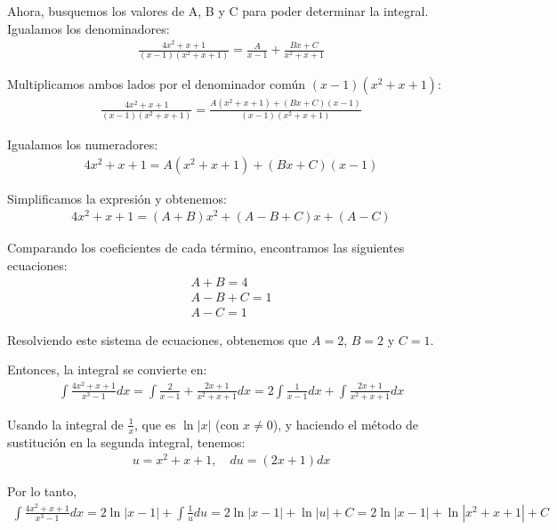 \documentclass{report}
\begin{document}
\begin{enumerate}
        Ahora, busquemos los valores de A, B y C para poder determinar la integral. Igualamos los denominadores:
        \begin{align*}
        \frac{4x^2+x+1}{(x-1)(x^2+x+1)}=\frac{A}{x-1}+\frac{Bx+C}{x^2+x+1}
        \end{align*}
        
        Multiplicamos ambos lados por el denominador común $(x-1)(x^2+x+1)$:
        \begin{align*}
        \frac{4x^2+x+1}{(x-1)(x^2+x+1)}=\frac{A(x^2+x+1)+(Bx+C)(x-1)}{(x-1)(x^2+x+1)}
        \end{align*}
        
        Igualamos los numeradores:
        \begin{align*}
        4x^2+x+1=A(x^2+x+1)+(Bx+C)(x-1)
        \end{align*}
        
        Simplificamos la expresión y obtenemos:
        \begin{align*}
        4x^2+x+1=(A+B)x^2+(A-B+C)x+(A-C)
        \end{align*}
        
        Comparando los coeficientes de cada término, encontramos las siguientes ecuaciones:
        \begin{align*}
        A+B=4 \\
        A-B+C=1 \\
        A-C=1
        \end{align*}
        
        Resolviendo este sistema de ecuaciones, obtenemos que $A=2$, $B=2$ y $C=1$.
        
        Entonces, la integral se convierte en:
        \begin{align*}
        \int{\frac{4x^2+x+1}{x^3-1}dx}=\int{\frac{2}{x-1}+\frac{2x+1}{x^2+x+1}dx}=2\int{\frac{1}{x-1}dx}+\int{\frac{2x+1}{x^2+x+1}dx}
        \end{align*}
        
        Usando la integral de $\frac{1}{x}$, que es $\ln{|x|}$ (con $x\neq0$), y haciendo el método de sustitución en la segunda integral, tenemos:
        \begin{align*}
        u=x^2+x+1, \quad du=(2x+1)dx
        \end{align*}
        
        Por lo tanto,
        \begin{align*}
        \int{\frac{4x^2+x+1}{x^3-1}dx}=2\ln{|x-1|}+\int{\frac{1}{u}du}=2\ln{|x-1|}+\ln{|u|}+C=2\ln{|x-1|}+\ln{|x^2+x+1|}+C
        \end{align*}
        

\end{enumerate}
\end{document}
